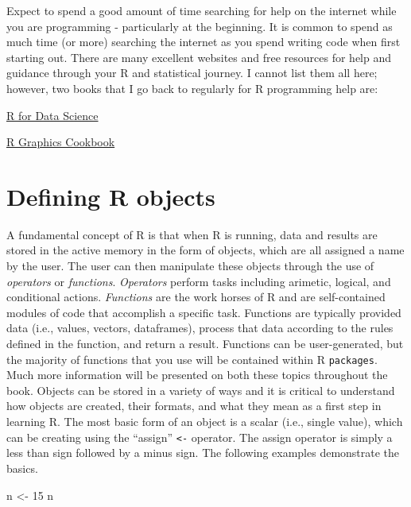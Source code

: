 \documentclass[
]{book}
\newenvironment{Shaded}{\begin{snugshade}}{\end{snugshade}}
\newcommand{\DecValTok}[1]{\textcolor[rgb]{0.00,0.00,0.81}{#1}}
\newcommand{\NormalTok}[1]{#1}
\newcommand{\OtherTok}[1]{\textcolor[rgb]{0.56,0.35,0.01}{#1}}
\begin{document}
Expect to spend a good amount of time searching for help on the internet while you are programming - particularly at the beginning. It is common to spend as much time (or more) searching the internet as you spend writing code when first starting out. There are many excellent websites and free resources for help and guidance through your R and statistical journey. I cannot list them all here; however, two books that I go back to regularly for R programming help are:

\href{https://r4ds.hadley.nz/}{R for Data Science}\li

\href{https://r-graphics.org/}{R Graphics Cookbook}\li

\hypertarget{defining-r-objects}{%
\section{Defining R objects}\label{defining-r-objects}}

A fundamental concept of R is that when R is running, data and results are stored in the active memory in the form of objects, which are all assigned a name by the user. The user can then manipulate these objects through the use of \emph{operators} or \emph{functions}. \emph{Operators} perform tasks including arimetic, logical, and conditional actions. \emph{Functions} are the work horses of R and are self-contained modules of code that accomplish a specific task. Functions are typically provided data (i.e., values, vectors, dataframes), process that data according to the rules defined in the function, and return a result. Functions can be user-generated, but the majority of functions that you use will be contained within R \texttt{packages}. Much more information will be presented on both these topics throughout the book. Objects can be stored in a variety of ways and it is critical to understand how objects are created, their formats, and what they mean as a first step in learning R. The most basic form of an object is a scalar (i.e., single value), which can be creating using the ``assign'' \texttt{\textless{}-} operator. The assign operator is simply a less than sign followed by a minus sign. The following examples demonstrate the basics.

\begin{Shaded}
\begin{Highlighting}[]
\NormalTok{n }\OtherTok{\textless{}{-}} \DecValTok{15}
\NormalTok{n}
\end{Highlighting}
\end{Shaded}
\end{document}
